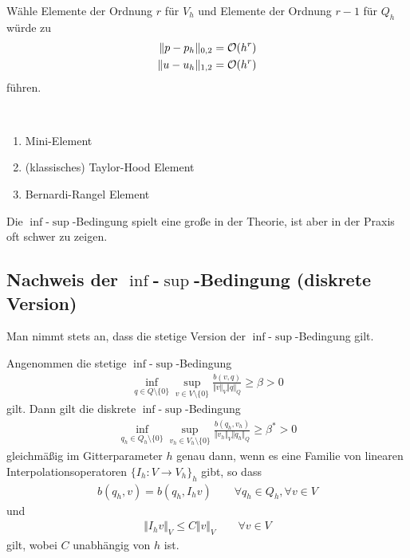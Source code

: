 Wähle Elemente der Ordnung $r$ für $V_h$ und Elemente der Ordnung $r-1$ für $Q_h$ würde zu 
\begin{align*}
	\Vert p-p_h\Vert_{0,2}&=\mathcal{O}(h^r)\\
	\Vert u-u_h\Vert_{1,2}&=\mathcal{O}(h^r)
\end{align*}
führen.

\begin{beispiel}\
	\begin{enumerate}
		\item Mini-Element
		\item (klassisches) Taylor-Hood Element
		\item Bernardi-Rangel Element
	\end{enumerate}
\end{beispiel}

Die $\inf$-$\sup$-Bedingung spielt eine große in der Theorie, ist aber in der Praxis oft schwer zu zeigen.

\subsection{Nachweis der \texorpdfstring{$\inf$-$\sup$}{inf-sup}-Bedingung (diskrete Version)}
Man nimmt stets an, dass die stetige Version der $\inf$-$\sup$-Bedingung gilt.

\begin{lemma}[Fortin, 1977]\label{lemmaFortin}\enter
	Angenommen die stetige $\inf$-$\sup$-Bedingung
	\begin{align*}
		\inf_{q\in Q\setminus\{0\}}\sup_{v\in V\setminus\{0\}}\frac{b(v,q)}{\Vert v \Vert_V\Vert q\Vert_Q}\geq\beta>0
	\end{align*}
	gilt. Dann gilt die diskrete $\inf$-$\sup$-Bedingung
	\begin{align*}
		\inf_{q_h\in Q_h\setminus\{0\}}\sup_{v_h\in V_h\setminus\{0\}}\frac{b(q_h,v_h)}{\Vert v_h \Vert_V\Vert q_h\Vert_Q}\geq\beta^\ast>0
	\end{align*}
	gleichmäßig im Gitterparameter $h$ genau dann, wenn
	es eine Familie von linearen Interpolationsoperatoren $\{I_h\colon V\to V_h\}_h$ gibt, so dass
	\begin{align}\label{eqLemmaFortinBed1}
		b(q_h,v)=b(q_h,I_h v)\qquad\forall q_h\in Q_h,\forall v\in V
	\end{align}
	und 
	\begin{align}\label{eqLemmaFortinBed2}
		\Vert I_h v\Vert_V\leq C\Vert v\Vert_V\qquad\forall v\in V
	\end{align}
	gilt, wobei $C$ unabhängig von $h$ ist.
\end{lemma}

